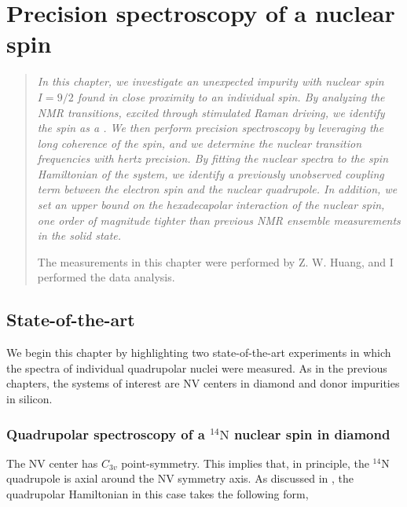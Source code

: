 \setchapterpreamble[u]{\margintoc}

\chapter{Precision spectroscopy of a \Nb nuclear spin}
\label{ch:nb_nuclear_spin}

\begin{quote}
\itshape
In this chapter, we investigate an unexpected impurity with nuclear spin $I=9/2$ found in close proximity to an individual \Er spin. By analyzing the NMR transitions, excited through stimulated Raman driving, we identify the spin as a \Nb. We then perform precision spectroscopy by leveraging the long coherence of the \Nb spin, and we determine the nuclear transition frequencies with hertz precision. By fitting the nuclear spectra to the spin Hamiltonian of the system, we identify a previously unobserved coupling term between the electron spin and the nuclear quadrupole. In addition, we set an upper bound on the hexadecapolar interaction of the \Nb nuclear spin, one order of magnitude tighter than previous NMR ensemble measurements in the solid state.

The measurements in this chapter were performed by Z. W. Huang, and I performed the data analysis.
\end{quote} 

\section{State-of-the-art}

We begin this chapter by highlighting two state-of-the-art experiments in which the spectra of individual quadrupolar nuclei were measured. As in the previous chapters, the systems of interest are NV centers in diamond and donor impurities in silicon.

\subsection*{Quadrupolar spectroscopy of a $^{14}\mathrm{N}$ nuclear spin in diamond}

The NV center has $C_{3v}$ point-symmetry. This implies that, in principle, the $^{14}\mathrm{N}$ quadrupole is axial around the NV symmetry axis. As discussed in , the quadrupolar Hamiltonian in this case takes the following form,

